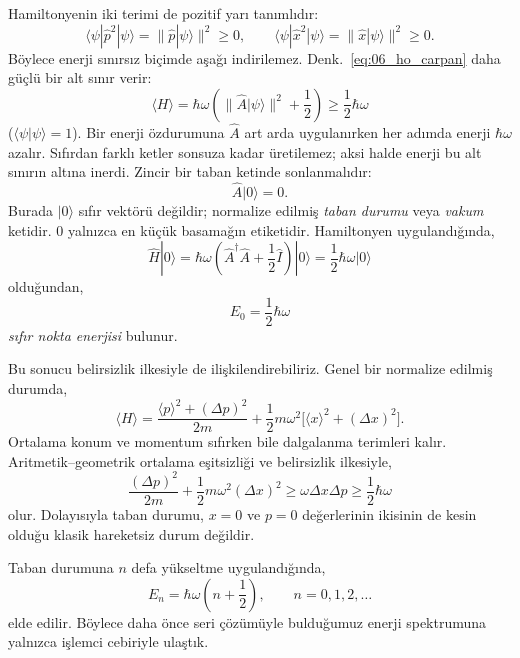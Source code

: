 \documentclass[00_kitap.tex]{subfiles}
\begin{document}
Hamiltonyenin iki terimi de pozitif yarı tanımlıdır:
\begin{equation}
 \langle\psi|\hat p^2|\psi\rangle
 =\|\hat p|\psi\rangle\|^2\ge0,\qquad
 \langle\psi|\hat x^2|\psi\rangle
 =\|\hat x|\psi\rangle\|^2\ge0.
\end{equation}
Böylece enerji sınırsız biçimde aşağı indirilemez.
Denk.~\eqref{eq:06_ho_carpan} daha güçlü bir alt sınır verir:
\begin{equation}
 \langle H\rangle
 =\hbar\omega\left(\|\hat A|\psi\rangle\|^2+\frac12\right)
 \ge\frac12\hbar\omega
 \label{eq:06_enerji_alt_sinir}
\end{equation}
($\langle\psi|\psi\rangle=1$). Bir enerji özdurumuna $\hat A$
art arda uygulanırken her adımda enerji $\hbar\omega$ azalır.
Sıfırdan farklı ketler sonsuza kadar üretilemez; aksi halde enerji
bu alt sınırın altına inerdi. Zincir bir taban ketinde sonlanmalıdır:
\begin{equation}
 \boxed{\hat A|0\rangle=0.}
 \label{eq:06_vakum}
\end{equation}
Burada $|0\rangle$ sıfır vektörü değildir; normalize edilmiş
\emph{taban durumu} veya \emph{vakum} ketidir. $0$ yalnızca en
küçük basamağın etiketidir. Hamiltonyen uygulandığında,
\begin{equation}
 \hat H|0\rangle
 =\hbar\omega\left(\hat A^\dagger\hat A+\frac12\hat I\right)
 |0\rangle=\frac12\hbar\omega|0\rangle
\end{equation}
olduğundan,
\begin{equation}
 \boxed{E_0=\frac12\hbar\omega}
\end{equation}
\emph{sıfır nokta enerjisi} bulunur.

Bu sonucu belirsizlik ilkesiyle de ilişkilendirebiliriz. Genel bir
normalize edilmiş durumda,
\begin{equation}
 \langle H\rangle
 =\frac{\langle p\rangle^2+(\Delta p)^2}{2m}
 +\frac12m\omega^2\bigl[\langle x\rangle^2+(\Delta x)^2\bigr].
\end{equation}
Ortalama konum ve momentum sıfırken bile dalgalanma terimleri kalır.
Aritmetik--geometrik ortalama eşitsizliği ve belirsizlik ilkesiyle,
\begin{equation}
 \frac{(\Delta p)^2}{2m}+\frac12m\omega^2(\Delta x)^2
 \ge\omega\Delta x\Delta p\ge\frac12\hbar\omega
\end{equation}
olur. Dolayısıyla taban durumu, $x=0$ ve $p=0$ değerlerinin ikisinin
de kesin olduğu klasik hareketsiz durum değildir.

Taban durumuna $n$ defa yükseltme uygulandığında,
\begin{equation}
 \boxed{E_n=\hbar\omega\left(n+\frac12\right),
 \qquad n=0,1,2,\ldots}
 \label{eq:06_spektrum}
\end{equation}
elde edilir. Böylece daha önce seri çözümüyle bulduğumuz enerji
spektrumuna yalnızca işlemci cebiriyle ulaştık.
\end{document}
